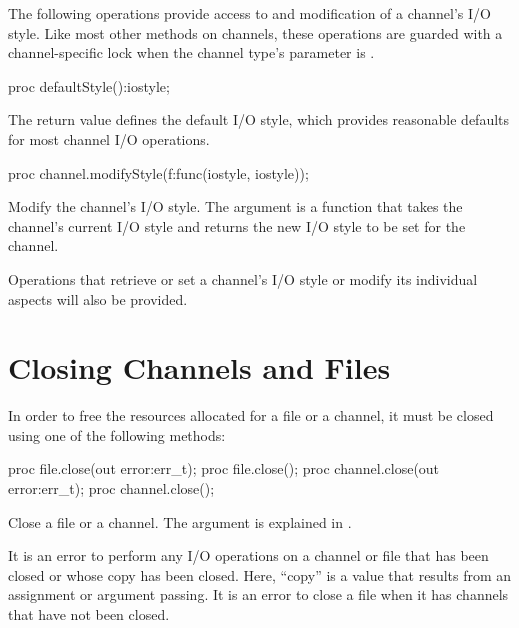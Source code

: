 The following operations provide access to and modification of
a channel's I/O style. Like most other methods on channels,
these operations are guarded with a channel-specific lock
when the channel type's  parameter is .

\begin{protohead}
proc defaultStyle():iostyle;
\end{protohead}
\begin{protobody}
The return value defines the default I/O style,
which provides reasonable defaults for most channel I/O operations.
\end{protobody}

\begin{protohead}
proc channel.modifyStyle(f:func(iostyle, iostyle));
\end{protohead}
\begin{protobody}
Modify the channel's I/O style. The argument is
a function that takes the channel's current I/O style and returns
the new I/O style to be set for the channel.
\end{protobody}

\begin{future}
Operations that retrieve or set a channel's I/O style
or modify its individual aspects will also be provided.
\end{future}


\section{Closing Channels and Files}
\label{IO_closing_files_channels}

In order to free the resources allocated for a file or a channel, it
must be closed using one of the following methods:

\begin{protohead}
proc file.close(out error:err_t);
proc file.close();
proc channel.close(out error:err_t);
proc channel.close();
\end{protohead}
\begin{protobody}
Close a file or a channel.
The  argument is explained in .
\end{protobody}

It is an error to perform any I/O operations on a channel or file
that has been closed or whose copy has been closed. Here, ``copy''
is a value that results from an assignment or argument passing.
%
It is an error to close a file when it has channels that
have not been closed.

